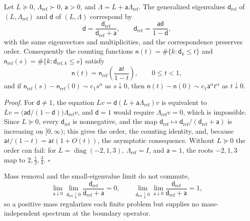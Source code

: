 Let \(L\succeq0\), \(\Lambda_{\mathrm{ref}}\succ0\), \(\mathsf a>0\), and
\(\Lambda=L+\mathsf a\Lambda_{\mathrm{ref}}\). The generalized eigenvalues
\(\mathsf d_{\mathrm{ref}}\) of \((L,\Lambda_{\mathrm{ref}})\) and \(\mathsf d\) of
\((L,\Lambda)\) correspond by
\begin{equation}
\mathsf d=\frac{\mathsf d_{\mathrm{ref}}}{\mathsf d_{\mathrm{ref}}+\mathsf a},
\qquad
\mathsf d_{\mathrm{ref}}=\frac{\mathsf a\mathsf d}{1-\mathsf d},
\label{eq:grg-mass-transfer}
\end{equation}
with the same eigenvectors and multiplicities, and the correspondence preserves
order. Consequently the counting functions
\(\mathsf n(t)=\#\{k:\mathsf d_k\leq t\}\) and
\(\mathsf n_{\mathrm{ref}}(s)=\#\{k:\mathsf d_{\mathrm{ref},k}\leq s\}\) satisfy
\begin{equation}
\mathsf n(t)=\mathsf n_{\mathrm{ref}}\left(\frac{\mathsf at}{1-t}\right),
\qquad 0\leq t<1,
\label{eq:grg-counting-transfer}
\end{equation}
and if \(\mathsf n_{\mathrm{ref}}(s)-\mathsf n_{\mathrm{ref}}(0)\sim\mathrm c_1s^\alpha\) as
\(s\downarrow0\), then \(\mathsf n(t)-\mathsf n(0)\sim\mathrm c_1\mathsf a^\alpha t^\alpha\) as
\(t\downarrow0\). 

\noindent\emph{Proof.}
For \(\mathsf d\neq1\), the equation \(Lv=\mathsf d(L+\mathsf a\Lambda_{\mathrm{ref}})v\)
is equivalent to \(Lv=\bigl(\mathsf a\mathsf d/(1-\mathsf d)\bigr)\Lambda_{\mathrm{ref}}v\),
and \(\mathsf d=1\) would require \(\Lambda_{\mathrm{ref}}v=0\), which is impossible.
Since \(L\succeq0\), every \(\mathsf d_{\mathrm{ref}}\) is nonnegative, and the map
\(\mathsf d_{\mathrm{ref}}\mapsto\mathsf d_{\mathrm{ref}}/(\mathsf d_{\mathrm{ref}}+\mathsf a)\)
is increasing on \([0,\infty)\); this gives the order, the counting identity, and,
because \(\mathsf at/(1-t)=\mathsf at(1+O(t))\), the asymptotic consequence. Without
\(L\succeq0\) the order can fail: for \(L=\operatorname{diag}(-2,1,3)\),
\(\Lambda_{\mathrm{ref}}=I\), and \(\mathsf a=1\), the roots \(-2,1,3\) map to
\(2,\tfrac12,\tfrac34\). \hfill$\square$

\medskip
Mass removal and the small-eigenvalue limit do not commute,
\begin{equation}
\lim_{\mathsf a\downarrow0}\lim_{\mathsf d_{\mathrm{ref}}\downarrow0}
\frac{\mathsf d_{\mathrm{ref}}}{\mathsf d_{\mathrm{ref}}+\mathsf a}=0,
\qquad
\lim_{\mathsf d_{\mathrm{ref}}\downarrow0}\lim_{\mathsf a\downarrow0}
\frac{\mathsf d_{\mathrm{ref}}}{\mathsf d_{\mathrm{ref}}+\mathsf a}=1,
\label{eq:grg-noncommuting-mass}
\end{equation}
so a positive mass regularizes each finite problem but supplies no mass-independent
spectrum at the boundary operator.

